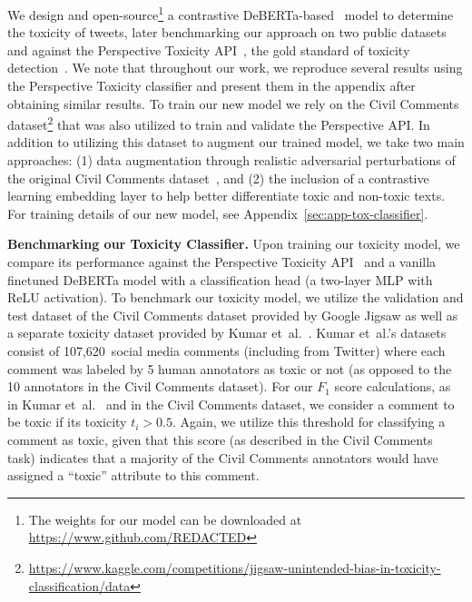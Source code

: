 We design and open-source\footnote{The weights for our model can be downloaded at \url{https://www.github.com/REDACTED}} a contrastive DeBERTa-based~\cite{he2022debertav3} model to determine the toxicity of tweets, later benchmarking our approach on two public datasets and against the Perspective Toxicity API~\cite{perspectiveapi}, the gold standard of toxicity detection~\cite{perspectiveapi,kumar2021designing,rajadesingan2020quick}. We note that throughout our work, we reproduce several results using the Perspective Toxicity classifier and present them in the appendix after obtaining similar results.
To train our new model we rely on the Civil Comments dataset\footnote{\url{https://www.kaggle.com/competitions/jigsaw-unintended-bias-in-toxicity-classification/data}} that was also utilized to train and validate the Perspective API. In addition to utilizing this dataset to augment our trained model, we take two main approaches: (1) data augmentation through realistic adversarial perturbations of the original Civil Comments dataset~\cite{le2022perturbations}, and (2) the inclusion of a contrastive learning embedding layer to help better differentiate toxic and non-toxic texts. For training details of our new model, see Appendix~\ref{sec:app-tox-classifier}.


\vspace{2pt}\noindent
\noindent
\textbf{Benchmarking our Toxicity Classifier.}
Upon training our toxicity model, we compare its performance against the Perspective Toxicity API~\cite{perspectiveapi} and a vanilla finetuned DeBERTa model with a classification head (a two-layer MLP with ReLU activation). To benchmark our toxicity model, we utilize the validation and test dataset of the Civil Comments dataset provided by Google Jigsaw\cite{perspectiveapi} as well as a separate toxicity dataset provided by Kumar {et~al.}~\cite{kumar2021designing}. Kumar  {et~al.}'s datasets consist of 107,620~social media comments (including from Twitter) where each comment was labeled by 5 human annotators as toxic or not (as opposed to the 10 annotators in the Civil Comments dataset). For our $F_1$ score calculations, as in Kumar {et~al.}~\cite{kumar2021designing} and in the Civil Comments dataset, we consider a comment to be toxic if its toxicity $t_i > 0.5$. Again, we utilize this threshold for classifying a comment as toxic, given that this score (as described in the Civil Comments task) indicates that a majority of the Civil Comments annotators would have assigned a ``toxic'' attribute to this comment.

